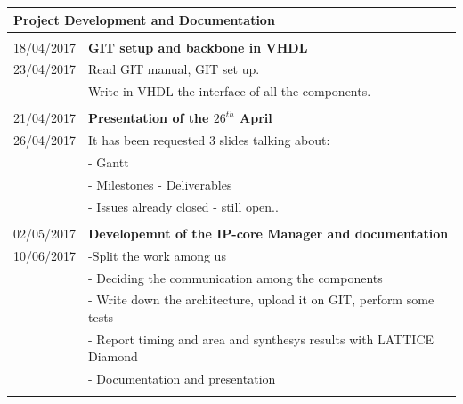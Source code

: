 \begin{table}
	\begin{tabular}{p{2.1cm}|  p{13.5cm}}
		\multicolumn{2}{p{15.0cm}}{ \LARGE{{Project Development and Documentation}}}\\
		\hline \hline 
		\multicolumn{2}{p{1.0cm}}{ \Large{{}}}\\
		18/04/2017 & \textbf{GIT setup and backbone in VHDL}\\
		23/04/2017& Read GIT manual, GIT set up.\\
		 &Write in VHDL the interface of all the components.\\
		\multicolumn{2}{p{1.0cm}}{ \Large{{ }}}\\	
		21/04/2017 & \textbf{Presentation of the $ 26^{th} $ April}	 \\
		26/04/2017 & It has been requested 3 slides talking about:\\
		& \quad- Gantt\\
			&\quad- Milestones - Deliverables\\
			&\quad- Issues already closed - still open..\\

	\multicolumn{2}{p{1.0cm}}{ \Large{{}}}\\
		02/05/2017 & \textbf{Developemnt of the IP-core Manager and documentation}\\
		10/06/2017&-Split the work among us\\
			& - Deciding the communication among the components\\
			& - Write down the architecture, upload it on GIT, perform some tests\\
			& - Report timing and area and synthesys results with LATTICE Diamond\\
			& - Documentation and presentation\\
		\multicolumn{2}{p{1.0cm}}{ \Large{{ }}}\\	
		
	\end{tabular}
\end{table}

